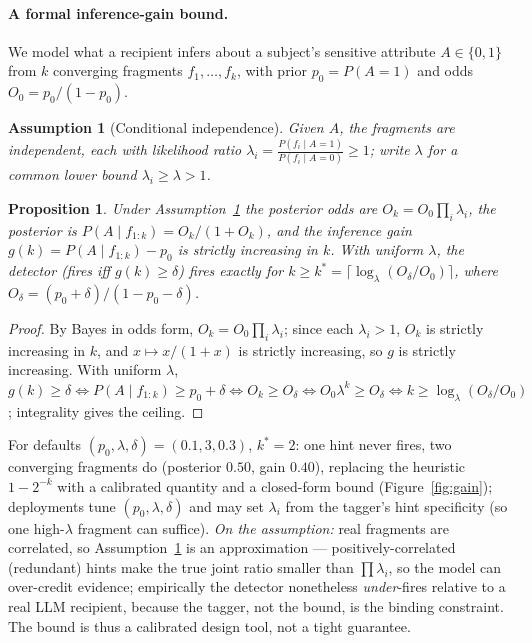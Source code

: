 \documentclass[conference,compsoc]{IEEEtran}
\newtheorem{proposition}{Proposition}
\newtheorem{assumption}{Assumption}
\begin{document}
\paragraph{A formal inference-gain bound.} We model what a recipient infers about
a subject's sensitive attribute $A\in\{0,1\}$ from $k$ converging fragments
$f_1,\dots,f_k$, with prior $p_0=P(A{=}1)$ and odds $O_0=p_0/(1-p_0)$.

\begin{assumption}[Conditional independence]\label{as:ci}
Given $A$, the fragments are independent, each with likelihood ratio
$\lambda_i=\tfrac{P(f_i\mid A{=}1)}{P(f_i\mid A{=}0)}\ge1$; write $\lambda$ for a
common lower bound $\lambda_i\ge\lambda>1$.
\end{assumption}

\begin{proposition}\label{prop:k}
Under Assumption~\ref{as:ci} the posterior odds are $O_k=O_0\prod_i\lambda_i$, the
posterior is $P(A\mid f_{1:k})=O_k/(1+O_k)$, and the inference gain
$g(k)=P(A\mid f_{1:k})-p_0$ is strictly increasing in $k$. With uniform $\lambda$,
the detector (fires iff $g(k)\ge\delta$) fires exactly for
$k\ge k^{*}=\big\lceil\log_\lambda(O_\delta/O_0)\big\rceil$, where
$O_\delta=(p_0+\delta)/(1-p_0-\delta)$.
\end{proposition}
\begin{proof}
By Bayes in odds form, $O_k=O_0\prod_i\lambda_i$; since each $\lambda_i>1$, $O_k$
is strictly increasing in $k$, and $x\mapsto x/(1+x)$ is strictly increasing, so
$g$ is strictly increasing. With uniform $\lambda$, $g(k)\ge\delta \iff
P(A\mid f_{1:k})\ge p_0+\delta \iff O_k\ge O_\delta \iff O_0\lambda^{k}\ge O_\delta
\iff k\ge\log_\lambda(O_\delta/O_0)$; integrality gives the ceiling.
\end{proof}
For defaults $(p_0,\lambda,\delta)=(0.1,3,0.3)$, $k^{*}=2$: one hint never fires,
two converging fragments do (posterior $0.50$, gain $0.40$), replacing the
heuristic $1-2^{-k}$ with a calibrated quantity and a closed-form bound (Figure~\ref{fig:gain});
deployments tune $(p_0,\lambda,\delta)$ and may set $\lambda_i$ from the tagger's
hint specificity (so one high-$\lambda$ fragment can suffice).
\emph{On the assumption:} real fragments are correlated, so
Assumption~\ref{as:ci} is an approximation --- positively-correlated (redundant)
hints make the true joint ratio smaller than $\prod\lambda_i$, so the model can
over-credit evidence; empirically the detector nonetheless \emph{under}-fires
relative to a real LLM recipient, because the tagger, not the bound, is the
binding constraint. The bound is thus a calibrated design tool, not a tight
guarantee.
\end{document}
